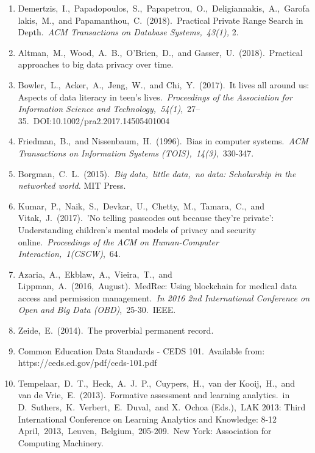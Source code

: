 \documentclass{article}
\begin{document}
\begin{enumerate}
    \label{sec:23}
    \item Demertzis,\ I.,\ Papadopoulos,\ S.,\ Papapetrou,\ O.,\ Deligiannakis,\ A.,\ Garofalakis,\ M.,\ and Papamanthou,\ C.\ (2018).\ Practical Private Range Search in Depth.\ \textit{ACM Transactions on Database Systems,\ 43(1),} 2.
    \label{sec:24}
    \item Altman,\ M.,\ Wood,\ A.\ B.,\ O'Brien,\ D.,\ and Gasser,\ U.\ (2018).\ Practical approaches to big data privacy over time.
    \label{sec:25}
    \item Bowler,\ L.,\ Acker,\ A.,\ Jeng,\ W.,\ and Chi,\ Y.\ (2017).\ It lives all around us: Aspects of data literacy in teen’s lives.\ \textit{Proceedings of the Association for Information Science and Technology,\ 54(1)},\ 27–35.\ DOI:10.1002/pra2.2017.14505401004 
    \label{sec:26}
    \item Friedman,\ B.,\ and Nissenbaum,\ H.\ (1996).\ Bias in computer systems.\ \textit{ACM Transactions on Information Systems (TOIS),\ 14(3)},\ 330-347.
    \label{sec:27}
    \item Borgman,\ C.\ L.\ (2015).\ \textit{Big data,\ little data,\ no data: Scholarship in the networked world.} MIT Press.
    \label{sec:28}
    \item Kumar,\ P.,\ Naik,\ S.,\ Devkar,\ U.,\ Chetty,\ M.,\ Tamara,\ C.,\ and Vitak,\ J.\ (2017).\ 'No telling passcodes out because they’re private’: Understanding children’s mental models of privacy and security online.\ \textit{Proceedings of the ACM on Human-Computer Interaction,\ 1(CSCW)},\ 64.
    \label{sec:29}
    \item Azaria,\ A.,\ Ekblaw,\ A.,\ Vieira,\ T.,\ and Lippman,\ A.\ (2016,\ August).\ MedRec: Using blockchain for medical data access and permission management.\ \textit{In 2016 2nd International Conference on Open and Big Data (OBD)},\  25-30.\ IEEE.
    \label{sec:30}
    \item Zeide,\ E.\ (2014).\ The proverbial permanent record.
    \label{sec:31}
    \item Common Education Data Standards - CEDS 101.\ Available from: https://ceds.ed.gov/pdf/ceds-101.pdf
    \label{sec:32}
    \item Tempelaar,\ D.\ T.,\ Heck,\ A.\ J.\ P.,\ Cuypers,\ H.,\ van der Kooij,\ H.,\ and van de Vrie,\ E.\ (2013).\ Formative assessment and learning analytics.\ in D.\ Suthers,\ K.\ Verbert,\ E.\ Duval,\ and X.\ Ochoa (Eds.),\ LAK 2013: Third International Conference on Learning Analytics and Knowledge: 8-12 April,\ 2013,\ Leuven,\ Belgium,\ 205-209.\ New York: Association for Computing Machinery.\ 

\end{enumerate}
\end{document}
